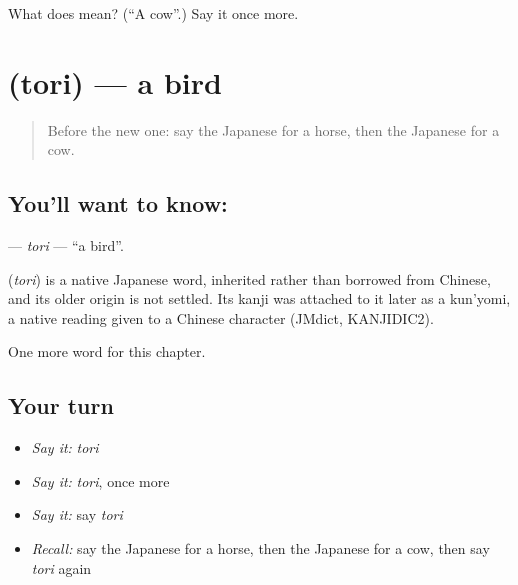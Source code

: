\begin{tcolorbox}[breakable,colback=teal!4,colframe=teal!35!black,title={Before you move on}]
What does  mean? (\textquotedblleft{}A cow\textquotedblright{}.) Say it once more.
\end{tcolorbox}
\section[\texorpdfstring{\ja{とり} (tori)}{とり (tori)}]{ (tori) — a bird}

\label{lesson:JA-C45-tori}



\begin{quote}
Before the new one: say the Japanese for a horse, then the Japanese for a cow.
\end{quote}

\subsection*{You'll want to know: }
\textbf{} — \emph{tori} — \textquotedblleft{}a bird\textquotedblright{}.

\begin{cousinweb}
\textbf{} (\emph{tori}) is a native Japanese word, inherited rather than borrowed from Chinese, and its older origin is not settled. Its kanji was attached to it later as a kun'yomi, a native reading given to a Chinese character (JMdict, KANJIDIC2).
\end{cousinweb}

\begin{grammarlens}[title={What you've built}]
One more word for this chapter.
\end{grammarlens}

\subsection*{Your turn}
\begin{itemize}
\raggedright
  \item \emph{Say it:} \emph{tori}
  \item \emph{Say it:} \emph{tori}, once more
  \item \emph{Say it:} say \emph{tori}
  \item \emph{Recall:} say the Japanese for a horse, then the Japanese for a cow, then say \emph{tori} again
\end{itemize}

